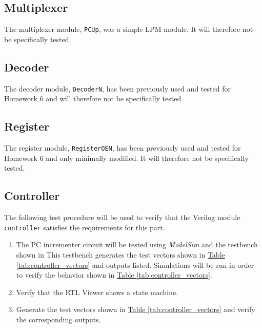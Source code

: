 \subsection{Multiplexer} %
\label{sub:multiplexer}

The multiplexer module, \verb|PCUp|, was a simple LPM module.
It will therefore not be specifically tested.


\subsection{Decoder} %
\label{sub:decoder}

The decoder module, \verb|DecoderN|, has been previously used and tested for Homework 6
and will therefore not be specifically tested.

\subsection{Register} %
\label{sub:register}

The register module, \verb|RegisterOEN|, has been previously used and tested for Homework 6 and only minimally modified.
It will therefore not be specifically tested.

\subsection{Controller} %
\label{sub:controller}

The following test procedure will be used to verify that the Verilog module \verb|controller| satisfies the requirements for this part.

\begin{enumerate}
    \item The PC incrementer circuit will be tested using \emph{ModelSim} and the testbench shown in %
    This testbench generates the test vectors shown in
    \hyperref[tab:controller_vectors]{Table \ref*{tab:controller_vectors}} and outputs listed.
    Simulations will be run in order to verify the behavior shown in
    \hyperref[tab:controller_vectors]{Table \ref*{tab:controller_vectors}}.
    \item Verify that the RTL Viewer shows a state machine.
    \item Generate the test vectors shown in \hyperref[tab:controller_vectors]{Table \ref*{tab:controller_vectors}}
    and verify the corresponding outputs.
\end{enumerate}

